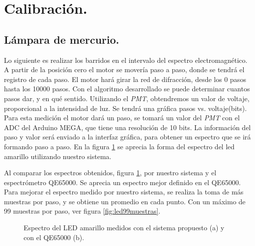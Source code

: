 \section{Calibración.}
\subsection{Lámpara de mercurio.}
Lo siguiente es realizar los barridos en el intervalo del espectro electromagnético. A partir de la posición cero el motor se movería paso a paso, donde se tendrá el registro de cada paso. El motor hará girar la red de difracción, desde los 0 pasos hasta los 10000 pasos. Con el algoritmo desarrollado se puede determinar cuantos pasos dar, y en qué sentido. Utilizando el \textit{PMT}, obtendremos un valor de voltaje, proporcional a la intensidad de luz. Se tendrá una gráfica pasos vs. voltaje(bits). 
Para esta medición el motor dará un paso, se tomará un valor del \textit{PMT} con el ADC del Arduino MEGA, que tiene una resolución de 10 bits. La información del paso y valor será enviado a la interfaz gráfica, para obtener un espectro que se irá formando paso a paso. En la figura \ref{fig:ledqe65} se aprecia la forma del espectro del led amarillo utilizando nuestro sistema. 


Al comparar los espectros obtenidos, figura \ref{fig:ledqe65}, por nuestro sistema y el espectrómetro QE65000. Se aprecia un espectro mejor definido en el QE65000. Para mejorar el espectro medido por nuestro sistema, se realiza la toma de más muestras por paso, y se obtiene un promedio en cada punto. Con un máximo de 99 muestras por paso, ver figura \ref{fig:led99muestras}.
\begin{figure}[h]
	\centering
	\caption{Espectro del LED amarillo medidos con el sistema propuesto (a) y con el QE65000 (b).}
	\label{fig:ledqe65}
\end{figure}

